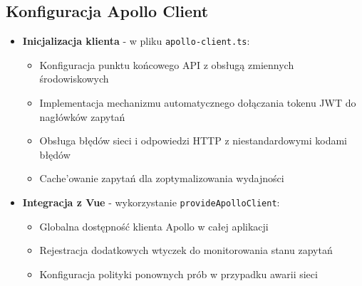 \documentclass{article}
\begin{document}
        \subsection{Konfiguracja Apollo Client}
          \begin{itemize}
            \item \textbf{Inicjalizacja klienta} - w pliku \texttt{apollo-client.ts}:
              \begin{itemize}
                \item Konfiguracja punktu końcowego API z obsługą zmiennych środowiskowych
                \item Implementacja mechanizmu automatycznego dołączania tokenu JWT do nagłówków zapytań
                \item Obsługa błędów sieci i odpowiedzi HTTP z niestandardowymi kodami błędów
                \item Cache'owanie zapytań dla zoptymalizowania wydajności
              \end{itemize}
            
            \item \textbf{Integracja z Vue} - wykorzystanie \texttt{provideApolloClient}:
              \begin{itemize}
                \item Globalna dostępność klienta Apollo w całej aplikacji
                \item Rejestracja dodatkowych wtyczek do monitorowania stanu zapytań
                \item Konfiguracja polityki ponownych prób w przypadku awarii sieci
              \end{itemize}
          \end{itemize}
        
\end{document}
